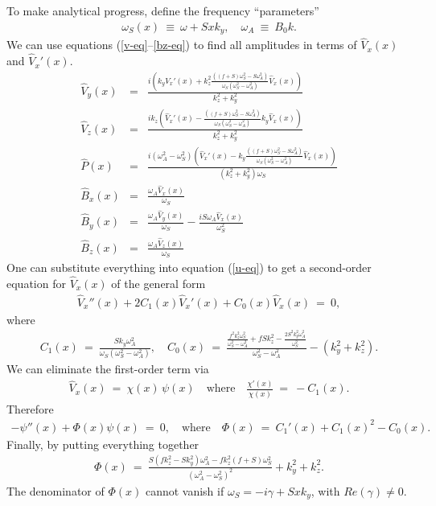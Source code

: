 \documentclass{rsproca_new}%
\newcommand\Beq{\begin{eqnarray}}
\newcommand\Eeq{\end{eqnarray}}
\begin{document}
To make analytical progress, define the frequency ``parameters'' 
\Beq
\omega_{S}(x) \ \equiv \ \omega + S x k_{y}, \quad \omega_{A}  \ \equiv \ B_{0} k.
\Eeq
We can use equations (\ref{v-eq}--\ref{bz-eq}) to find all amplitudes in terms of $\hat{V}_{x}(x)$ and $\hat{V}_{x}'(x)$. 
\Beq
\hat{V}_{y}(x) &=& \frac{i \left(k_{y} 
   \hat{V}_{x}'(x) + k_{z}^2 \frac{ \left((f+S) \omega
   _S^2-S \omega _A^2\right)}{\omega_{S}
   \left(\omega_{S}^2-\omega _A^2\right)} \hat{V}_{x}(x)\right)}{k_{z}^2+k_{y} ^2} \\
\hat{V}_{z}(x) &=& \frac{i k_{z} \left(\hat{V}_{x}'(x)- \frac{ \left((f+S) \omega
   _S^2-S \omega _A^2\right)}{\omega_{S}
   \left(\omega_{S}^2-\omega _A^2\right)}  k_{y} 
   \hat{V}_{x}(x)\right)}{k_{z}^2+k_{y} ^2} \\
   \hat{P}(x) &=& \frac{i \left(\omega _A^2-\omega_{S}^2\right)
   \left(\hat{V}_{x}'(x) -  k_{y} \frac{ \left((f+S) \omega
   _S^2-S \omega _A^2\right)}{\omega_{S}
   \left(\omega_{S}^2-\omega _A^2\right)}
   \hat{V}_{x}(x)\right)}{\left(k_{z}^2+k_{y} ^2\right)
   \omega_{S}} \\
   \hat{B}_{x}(x) &=& \frac{\omega _A \hat{V}_{x}(x)}{\omega_{S}} \\
   \hat{B}_{y}(x) &=&\frac{\omega _A \hat{V}_{y}(x)}{\omega_{S}} -\frac{i S \omega _A \hat{V}_{x}(x)}{\omega_{S}^2} \\
   \hat{B}_{z}(x) &=& \frac{\omega _A \hat{V}_{z}(x)}{\omega_{S}}
   \Eeq
One can substitute everything into equation (\ref{u-eq}) to get a second-order equation for $\hat{V}_{x}(x)$ of the general form 
\Beq
 \hat{V}_{x}''(x) + 2 C_{1}(x) \hat{V}_{x}'(x) + C_{0}(x) \hat{V}_{x}(x) \ = \ 0,
\Eeq
where
\Beq
   C_{1}(x) \ = \  \frac{ S k_{y}  \omega _A^2}{\omega_{S} ( \omega_{S}^2-\omega _A^2 )} , \quad C_{0}(x) \ = \   \frac{\frac{f^{2} k_{z}^2 \omega_{S}^{2}}{\omega_{S}^{2}-\omega
   _A^2}+f  S  k_{z}^2 -\frac{2 S^2  k_{y}^2 \omega _A^2}{\omega_{S}^{2}}}{\omega_{S}^2-\omega _A^2}  -\left(k_{y}^{2} + k_{z}^2 \right) .
\Eeq
We can eliminate the first-order term via
\Beq
\hat{V}_{x}(x) \ = \ \chi(x)\, \psi(x) \quad \text{where} \quad \frac{\chi'(x)}{\chi(x)} \  = \ - C_{1} (x).
\Eeq
Therefore 
\Beq
-\psi''(x) + \Phi(x) \psi(x) \ = \ 0 \label{Schr-eq}, \quad \text{where}\quad
\Phi(x)  \ = \ C_{1}'(x) + C_{1} (x)^{2} - C_{0}(x).
\Eeq
Finally, by putting everything together 
\Beq
\Phi(x) \ = \ \frac{S  \left(f k_{z}^2-S k_{y}
   ^2\right) \omega _A^2 -f k_{z}^2 (f+S) \omega
   _S^2}{\left(\omega _A^2-\omega
   _S^2\right)^2} + k_{y}^{2} + k_{z}^2 .
\Eeq
The denominator of $\Phi(x)$ cannot vanish if $\omega_{S}=-i \gamma+Sxk_{y}$, with $Re(\gamma)\neq0$. 
\end{document}
